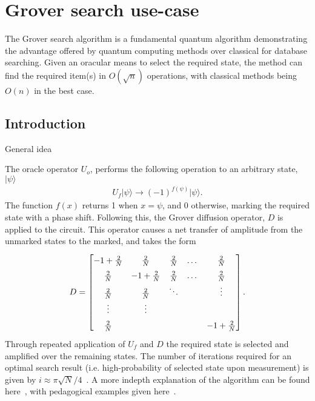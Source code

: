 \section{Grover search use-case}
The Grover search algorithm is a fundamental quantum algorithm demonstrating the advantage offered by quantum computing methods over classical for database searching. Given an oracular means to select the required state, the method can find the required item(s) in $O(\sqrt{n})$ operations, with classical methods being $O(n)$ in the best case.

\subsection{Introduction}
General idea

The oracle operator $U_o$, performs the following operation to an arbitrary state, $\vert \psi \rangle$
\begin{align}
U_f\vert \psi \rangle \rightarrow (-1)^{f(\psi)}  \vert \psi \rangle.
\end{align}
The function $f(x)$ returns 1 when $x = \psi$, and 0 otherwise, marking the required state with a phase shift. Following this, the Grover diffusion operator, $D$ is applied to the circuit. This operator causes a net transfer of amplitude from the unmarked states to the marked, and takes the form 
\begin{align}
D = 
\renewcommand\arraystretch{1.5}
\begin{bmatrix}
-1 +\frac{2}{N} & \frac{2}{N}      & \frac{2}{N}      & \dots & \frac{2}{N}     \\
\frac{2}{N}     & -1 +\frac{2}{N}  & \frac{2}{N}      & \dots & \frac{2}{N}     \\
\frac{2}{N}     & \frac{2}{N}      & \ddots           &       & \vdots          \\
\vdots          &  \vdots          &                  &       &                 \\
\frac{2}{N}     &                  &                  &       & -1 +\frac{2}{N} \\
\end{bmatrix}.
\end{align}
Through repeated application of $U_f$ and $D$ the required state is selected and amplified over the remaining states. The number of iterations required for an optimal search result (i.e. high-probability of selected state upon measurement) is given by $i\approx\pi\sqrt{N}/4$~\cite{nielsen_chuang_2010}. A more indepth explanation of the algorithm can be found here~\cite{grover_1996,Grover_2001}, with pedagogical examples given here~\cite{qiskit_grover_2020}.

